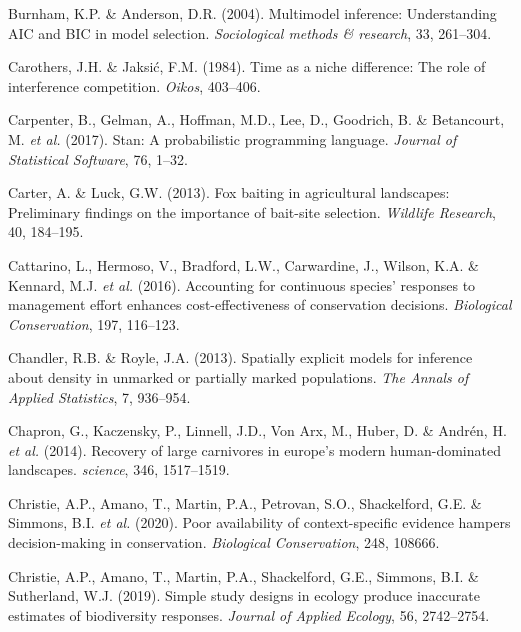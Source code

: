 \documentclass[11pt,a4paper,titlepage,twoside,openright]{style/unimelbthesis}
\begin{document}
\begin{mainmatter}
\leavevmode\hypertarget{ref-burnham2004multimodel}{}%
Burnham, K.P. \& Anderson, D.R. (2004). Multimodel inference: Understanding AIC and BIC in model selection. \emph{Sociological methods \& research}, 33, 261--304.

\leavevmode\hypertarget{ref-carothers1984time}{}%
Carothers, J.H. \& Jaksić, F.M. (1984). Time as a niche difference: The role of interference competition. \emph{Oikos}, 403--406.

\leavevmode\hypertarget{ref-carpenter2017stan}{}%
Carpenter, B., Gelman, A., Hoffman, M.D., Lee, D., Goodrich, B. \& Betancourt, M. \emph{et al.} (2017). Stan: A probabilistic programming language. \emph{Journal of Statistical Software}, 76, 1--32.

\leavevmode\hypertarget{ref-carter2013fox}{}%
Carter, A. \& Luck, G.W. (2013). Fox baiting in agricultural landscapes: Preliminary findings on the importance of bait-site selection. \emph{Wildlife Research}, 40, 184--195.

\leavevmode\hypertarget{ref-cattarino2016accounting}{}%
Cattarino, L., Hermoso, V., Bradford, L.W., Carwardine, J., Wilson, K.A. \& Kennard, M.J. \emph{et al.} (2016). Accounting for continuous species' responses to management effort enhances cost-effectiveness of conservation decisions. \emph{Biological Conservation}, 197, 116--123.

\leavevmode\hypertarget{ref-chandler2013spatially}{}%
Chandler, R.B. \& Royle, J.A. (2013). Spatially explicit models for inference about density in unmarked or partially marked populations. \emph{The Annals of Applied Statistics}, 7, 936--954.

\leavevmode\hypertarget{ref-chapron2014recovery}{}%
Chapron, G., Kaczensky, P., Linnell, J.D., Von Arx, M., Huber, D. \& Andrén, H. \emph{et al.} (2014). Recovery of large carnivores in europe's modern human-dominated landscapes. \emph{science}, 346, 1517--1519.

\leavevmode\hypertarget{ref-christie2020poor}{}%
Christie, A.P., Amano, T., Martin, P.A., Petrovan, S.O., Shackelford, G.E. \& Simmons, B.I. \emph{et al.} (2020). Poor availability of context-specific evidence hampers decision-making in conservation. \emph{Biological Conservation}, 248, 108666.

\leavevmode\hypertarget{ref-christie2019simple}{}%
Christie, A.P., Amano, T., Martin, P.A., Shackelford, G.E., Simmons, B.I. \& Sutherland, W.J. (2019). Simple study designs in ecology produce inaccurate estimates of biodiversity responses. \emph{Journal of Applied Ecology}, 56, 2742--2754.


\end{mainmatter}
\end{document}
